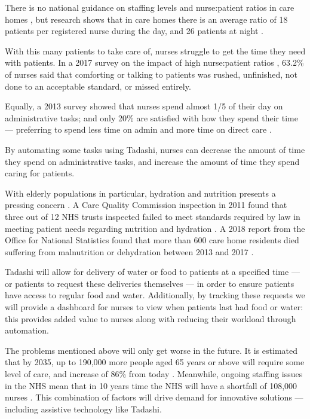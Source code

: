 \documentclass{article}
\begin{document}
There is no national guidance on staffing levels and nurse:patient ratios in care homes \cite{rcnstaffingadvice}, but research shows that in care homes there is an average ratio of 18 patients per registered nurse during the day, and 26 patients at night \cite{rcnstaffingguidance}.

With this many patients to take care of, nurses struggle to get the time they need with patients. In a 2017 survey on the impact of high nurse:patient ratios \cite{unison}, 63.2\% of nurses said that comforting or talking to patients was rushed, unfinished, not done to an acceptable standard, or missed entirely.

Equally, a 2013 survey showed that nurses spend almost 1/5 of their day on administrative tasks; and only 20\% are satisfied with how they spend their time --- preferring to spend less time on admin and more time on direct care \cite{rcnpol}.

By automating some tasks using Tadashi, nurses can decrease the amount of time they spend on administrative tasks, and increase the amount of time they spend caring for patients.

With elderly populations in particular, hydration and nutrition presents a pressing concern \cite{hydrate}. A Care Quality Commission inspection in 2011 found that three out of 12 NHS trusts inspected failed to meet standards required by law in meeting patient needs regarding nutrition and hydration \cite{cqc}. A 2018 report from the Office for National Statistics found that more than 600 care home residents died suffering from malnutrition or dehydration between 2013 and 2017 \cite{ons}.

Tadashi will allow for delivery of water or food to patients at a specified time --- or patients to request these deliveries themselves --- in order to ensure patients have access to regular food and water. Additionally, by tracking these requests we will provide a dashboard for nurses to view when patients last had food or water: this provides added value to nurses along with reducing their workload through automation. 

The problems mentioned above will only get worse in the future. It is estimated that by 2035, up to 190,000 more people aged 65 years or above will require some level of care, and increase of 86\% from today \cite{lancet}. Meanwhile, ongoing staffing issues in the NHS mean that in 10 years time the NHS will have a shortfall of 108,000 nurses \cite{nuffield}. This combination of factors will drive demand for innovative solutions --- including assistive technology like Tadashi.
\end{document}
